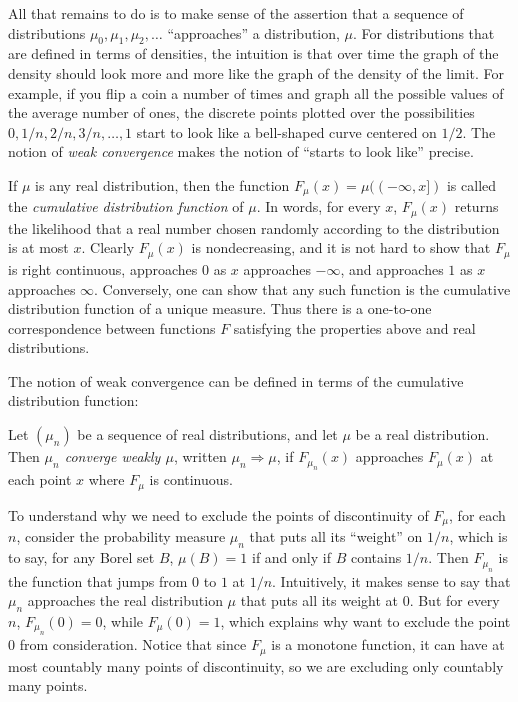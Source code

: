 \documentclass{svjour3}
\begin{document}
All that remains to do is to make sense of the assertion that a sequence of distributions $\mu_0, \mu_1, \mu_2, \ldots$ ``approaches'' a distribution, $\mu$. For distributions that are defined in terms of densities, the intuition is that over time the graph of the density should look more and more like the graph of the density of the limit. For example, if you flip a coin a number of times and graph all the possible values of the average number of ones, the discrete points plotted over the possibilities $0, 1/n, 2/n, 3/n, \ldots, 1$ start to look like a bell-shaped curve centered on $1 / 2$. The notion of \emph{weak convergence} makes the notion of ``starts to look like'' precise.

If $\mu$ is any real distribution, then the function $F_\mu(x) = \mu((-\infty, x])$ is called the \emph{cumulative distribution function} of $\mu$. In words, for every $x$, $F_\mu(x)$ returns the likelihood that a real number chosen randomly according to the distribution is at most $x$. Clearly $F_\mu(x)$ is nondecreasing, and it is not hard to show that $F_\mu$ is right continuous, approaches $0$ as $x$ approaches $-\infty$, and approaches $1$ as $x$ approaches $\infty$. Conversely, one can show that any such function is the cumulative distribution function of a unique measure. Thus there is a one-to-one correspondence between functions $F$ satisfying the properties above and real distributions.

The notion of weak convergence can be defined in terms of the cumulative distribution function:
\begin{definition}
 Let $(\mu_n)$ be a sequence of real distributions, and let $\mu$ be a real distribution. Then \emph{$\mu_n$ converge weakly $\mu$}, written $\mu_n \Rightarrow \mu$, if $F_{\mu_n}(x)$ approaches $F_\mu(x)$ at each point $x$ where $F_\mu$ is continuous.
\end{definition}

To understand why we need to exclude the points of discontinuity of $F_\mu$, for each $n$, consider the probability measure $\mu_n$ that puts all its ``weight'' on $1 / n$, which is to say, for any Borel set $B$, $\mu(B) = 1$ if and only if $B$ contains $1 / n$. Then $F_{\mu_n}$ is the function that jumps from $0$ to $1$ at $1 / n$. Intuitively, it makes sense to say that $\mu_n$ approaches the real distribution $\mu$ that puts all its weight at $0$. But for every $n$, $F_{\mu_n}(0) = 0$, while $F_\mu(0) = 1$, which explains why want to exclude the point $0$ from consideration. Notice that since $F_\mu$ is a monotone function, it can have at most countably many points of discontinuity, so we are excluding only countably many points.
\end{document}

